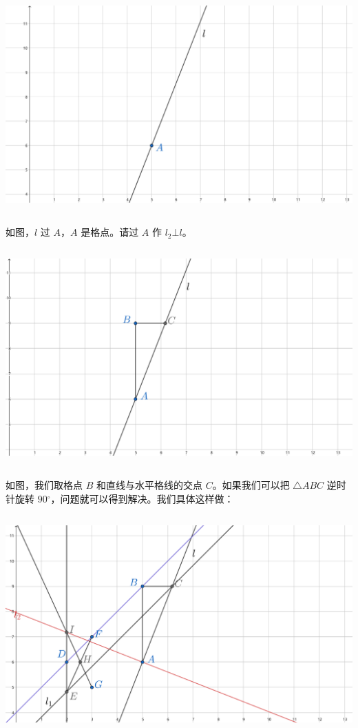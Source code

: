 \documentclass[UTF8]{article}
\begin{document}
\includegraphics[width=5.76806in,height=3.27847in]{media/image44.png}

如图，\(l\) 过 \(A\)，\(A\) 是格点。请过 \(A\) 作 \(l_{2}\bot l\)。

\includegraphics[width=5.76806in,height=3.27847in]{media/image45.png}

如图，我们取格点 \(B\) 和直线与水平格线的交点 \(C\)。如果我们可以把
\(\bigtriangleup ABC\) 逆时针旋转
\(90{^\circ}\)，问题就可以得到解决。我们具体这样做：

\includegraphics[width=5.76806in,height=3.27847in]{media/image46.png}
\end{document}
